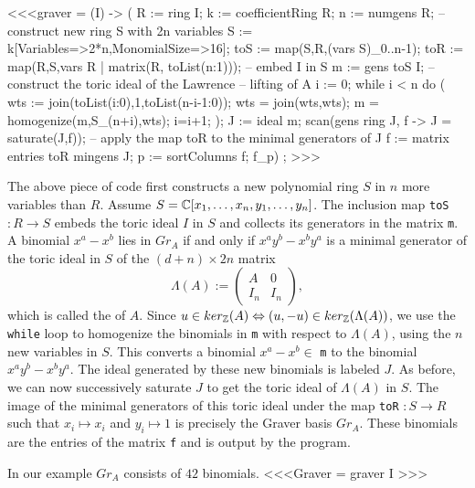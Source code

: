 <<<graver = (I) -> (
    R := ring I;
    k := coefficientRing R;
    n := numgens R;
    -- construct new ring S with 2n variables
    S := k[Variables=>2*n,MonomialSize=>16];
    toS := map(S,R,(vars S)_{0..n-1});
    toR := map(R,S,vars R | matrix(R, {toList(n:1)}));
    -- embed I in S
    m := gens toS I;
    -- construct the toric ideal of the Lawrence 
    -- lifting of A
    i := 0;
    while i < n do (
        wts := join(toList(i:0),{1},toList(n-i-1:0));
        wts = join(wts,wts);
        m = homogenize(m,S_(n+i),wts);
        i=i+1;
        );
   J := ideal m;
   scan(gens ring J, f -> J = saturate(J,f));
   -- apply the map toR to the minimal generators of J 
   f := matrix entries toR mingens J;
   p := sortColumns f;
   f_p) ;  >>>
   
   The above piece of code first constructs a new polynomial ring $S$
   in $n$ more variables than $R$. Assume $S = \mathbb{C} [x_1, \ldots, x_n,
   y_1, \ldots, y_n]$. The inclusion map {\tt toS} $: R \rightarrow
   S$ embeds the toric ideal $I$ in $S$ and collects its generators in
   the matrix {\tt m}. A binomial $x^a - x^b$ lies in $Gr_A$ if and only
   if $x^ay^b-x^by^a$ is a minimal generator of the toric ideal in $S$
   of the $(d+n) \times 2n$ matrix $$\Lambda(A) := \left (
     \begin{array}{cc} A & 0 \\ I_n & I_n \end{array} \right),$$ which
   is called the {\em {}} of $A$. Since $u \in
   ker_{\mathbb{Z}}(A) \Leftrightarrow (u,-u) \in ker_{\mathbb{Z}} (\Lambda(A))$, we
   use the {\tt while} loop to homogenize the binomials in {\tt m} with
   respect to $\Lambda(A)$, using the $n$ new variables in $S$. This
   converts a binomial $x^a-x^b \in$ {\tt m} to the binomial
   $x^ay^b-x^by^a$.  The ideal generated by these new binomials is
   labeled $J$. As before, we can now successively saturate $J$
   to get the toric ideal of $\Lambda(A)$ in $S$. The image of the
   minimal generators of this toric ideal under the map {\tt toR}
   $: S \rightarrow R$ such that $x_i \mapsto x_i$ and $y_i \mapsto 1$
   is precisely the Graver basis $Gr_A$. These binomials are the
   entries of the matrix {\tt f} and is output by the program.

In our example $Gr_A$ consists of $42$ binomials.
<<<Graver = graver I >>> 

